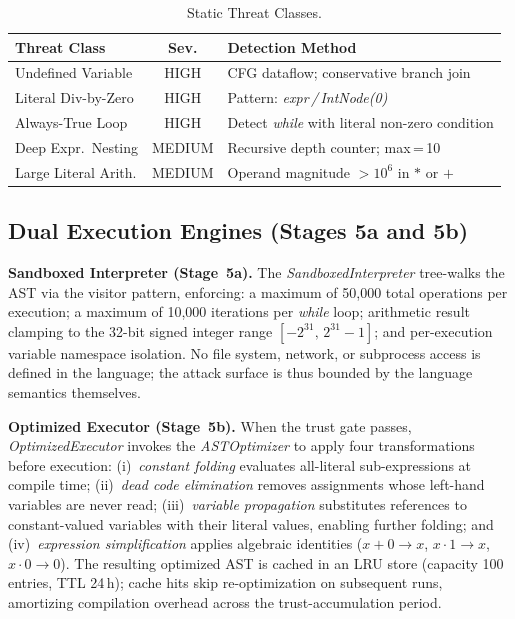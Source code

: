 \documentclass[conference]{IEEEtran}
\begin{document}
\begin{table}[t]
\caption{Static Threat Classes.}
\label{tab:static}
\centering
\renewcommand{\arraystretch}{1.18}
\small
\begin{tabular}{@{} p{2.15cm} c p{3.15cm} @{}}
\toprule
\textbf{Threat Class} & \textbf{Sev.} & \textbf{Detection Method} \\
\midrule
Undefined Variable    & HIGH   & CFG dataflow; conservative branch
                                 join \\[2pt]
Literal Div-by-Zero   & HIGH   & Pattern: \textit{expr\,/\,IntNode(0)}
                                 \\[2pt]
Always-True Loop      & HIGH   & Detect \textit{while} with literal
                                 non-zero condition \\[2pt]
Deep Expr.\ Nesting   & MEDIUM & Recursive depth counter; max\,=\,10
                                 \\[2pt]
Large Literal Arith.  & MEDIUM & Operand magnitude $>10^{6}$ in
                                 $*$ or $+$ \\
\bottomrule
\end{tabular}
\end{table}

\subsection{Dual Execution Engines (Stages 5a and 5b)}

\textbf{Sandboxed Interpreter (Stage~5a).} The
\textit{SandboxedInterpreter} tree-walks the AST via the visitor
pattern, enforcing: a maximum of 50,000 total operations per
execution; a maximum of 10,000 iterations per \textit{while} loop;
arithmetic result clamping to the 32-bit signed integer range
$[-2^{31},\,2^{31}-1]$; and per-execution variable namespace
isolation. No file system, network, or subprocess access is defined
in the language; the attack surface is thus bounded by the language
semantics themselves.

\textbf{Optimized Executor (Stage~5b).} When the trust gate
passes, \textit{OptimizedExecutor} invokes the
\textit{ASTOptimizer} to apply four
transformations before execution: (i)~\emph{constant folding}
evaluates all-literal sub-expressions at compile time; (ii)~\emph{dead
code elimination} removes assignments whose left-hand variables are
never read; (iii)~\emph{variable propagation} substitutes
references to constant-valued variables with their literal values,
enabling further folding; and (iv)~\emph{expression simplification}
applies algebraic identities ($x+0\to x$, $x\cdot1\to x$,
$x\cdot0\to0$). The resulting optimized AST is cached in an LRU
store (capacity 100 entries, TTL 24\,h); cache hits skip
re-optimization on subsequent runs, amortizing compilation overhead
across the trust-accumulation period.
\end{document}
